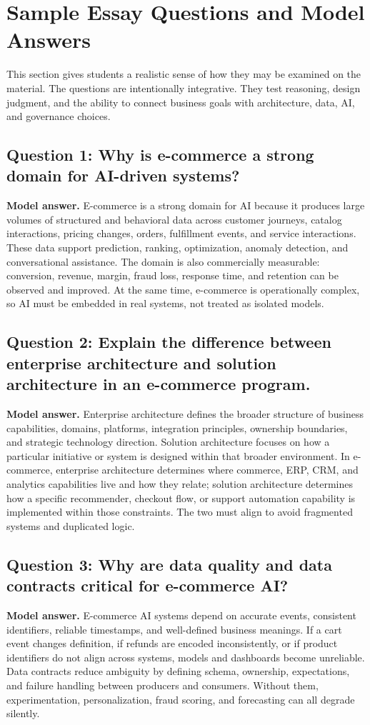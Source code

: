 \chapter*{Sample Essay Questions and Model Answers}

This section gives students a realistic sense of how they may be examined on the material.
The questions are intentionally integrative.
They test reasoning, design judgment, and the ability to connect business goals with architecture, data, AI, and governance choices.

\section*{Question 1: Why is e-commerce a strong domain for AI-driven systems?}
\textbf{Model answer.}
E-commerce is a strong domain for AI because it produces large volumes of structured and behavioral data across customer journeys, catalog interactions, pricing changes, orders, fulfillment events, and service interactions.
These data support prediction, ranking, optimization, anomaly detection, and conversational assistance.
The domain is also commercially measurable: conversion, revenue, margin, fraud loss, response time, and retention can be observed and improved.
At the same time, e-commerce is operationally complex, so AI must be embedded in real systems, not treated as isolated models.

\section*{Question 2: Explain the difference between enterprise architecture and solution architecture in an e-commerce program.}
\textbf{Model answer.}
Enterprise architecture defines the broader structure of business capabilities, domains, platforms, integration principles, ownership boundaries, and strategic technology direction.
Solution architecture focuses on how a particular initiative or system is designed within that broader environment.
In e-commerce, enterprise architecture determines where commerce, ERP, CRM, and analytics capabilities live and how they relate; solution architecture determines how a specific recommender, checkout flow, or support automation capability is implemented within those constraints.
The two must align to avoid fragmented systems and duplicated logic.

\section*{Question 3: Why are data quality and data contracts critical for e-commerce AI?}
\textbf{Model answer.}
E-commerce AI systems depend on accurate events, consistent identifiers, reliable timestamps, and well-defined business meanings.
If a cart event changes definition, if refunds are encoded inconsistently, or if product identifiers do not align across systems, models and dashboards become unreliable.
Data contracts reduce ambiguity by defining schema, ownership, expectations, and failure handling between producers and consumers.
Without them, experimentation, personalization, fraud scoring, and forecasting can all degrade silently.

